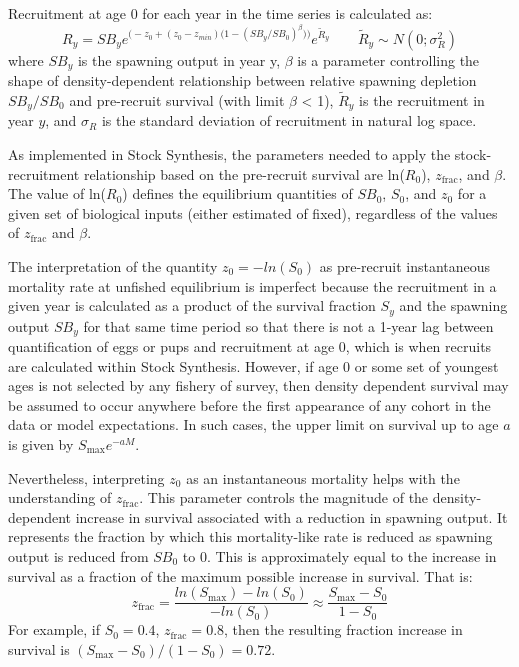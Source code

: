Recruitment at age 0 for each year in the time series is calculated as:
	\begin{equation}{ R_y = SB_ye^{\Big(-z_0 + (z_0-z_{min})\big(1-(SB_y/SB_0)^\beta \big)\Big)}e^{\tilde{R}_y}\qquad  \tilde{R}_y\sim N(0;\sigma^2_R)}
	\end{equation}
where $SB_y$ is the spawning output in year y,  $\beta$ is a parameter controlling the shape of density-dependent relationship between relative spawning depletion $SB_y/SB_0$ and pre-recruit survival (with limit $\beta$ < 1), $\tilde{R}_y$ is the recruitment in year $y$, and $\sigma_R$ is the standard deviation of recruitment in natural log space. 
	
As implemented in Stock Synthesis, the parameters needed to apply the stock-recruitment relationship based on the pre-recruit survival are ln($R_0$), $z_{\text{frac}}$, and $\beta$. The value of ln($R_0$) defines the equilibrium quantities of $SB_0$, $S_0$, and $z_0$ for a given set of biological inputs (either estimated of fixed), regardless of the values of $z_{\text{frac}}$ and $\beta$.
	
The interpretation of the quantity $z_0=-ln(S_0)$ as pre-recruit instantaneous mortality rate at unfished equilibrium is imperfect because the recruitment in a given year is calculated as a product of the survival fraction $S_y$ and the spawning output $SB_y$ for that same time period so that there is not a 1-year lag between quantification of eggs or pups and recruitment at age 0, which is when recruits are calculated within Stock Synthesis. However, if age 0 or some set of youngest ages is not selected by any fishery of survey, then density dependent survival may be assumed to occur anywhere before the first appearance of any cohort in the data or model expectations. In such cases, the upper limit on survival up to age $a$ is given by $S_{\text{max}}e^{-aM}$. 
	
Nevertheless, interpreting $z_0$ as an instantaneous mortality helps with the understanding of $z_{\text{frac}}$. This parameter controls the magnitude of the density-dependent increase in survival associated with a reduction in spawning output. It represents the fraction by which this mortality-like rate is reduced as spawning output is reduced from $SB_0$ to 0. This is approximately equal to the increase in survival as a fraction of the maximum possible increase in survival. That is: 
	\begin{equation}
		z_{\text{frac}}=\frac{ln(S_{\text{max}})-ln(S_0)}{-ln(S_0)} \approx \frac{S_{\text{max}}-S_0}{1-S_0}
	\end{equation}
For example, if $S_0 = 0.4$, $z_{\text{frac}}=0.8$, then the resulting fraction increase in survival is $(S_{\text{max}}-S_0)/(1-S_0)=0.72$.
	
